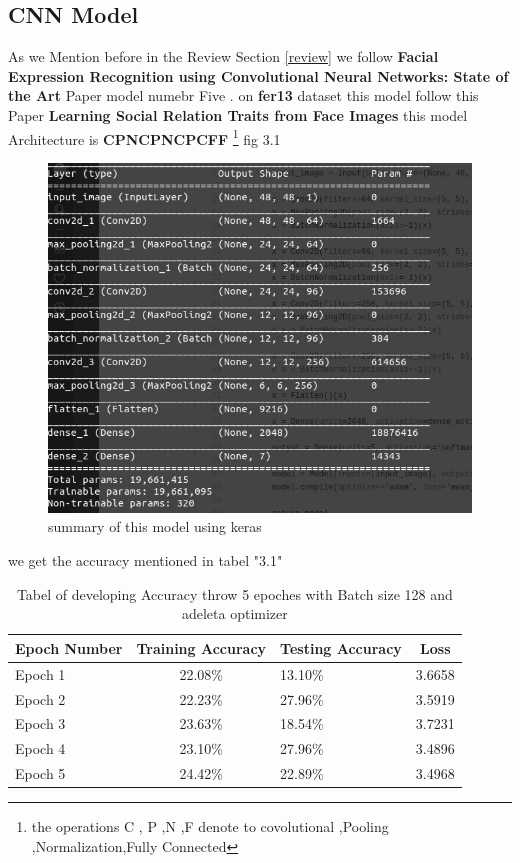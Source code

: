 \subsection{CNN Model}
As we Mention before in the Review Section \ref{review} we follow \textbf{Facial Expression Recognition using Convolutional Neural Networks: State of the Art} Paper\cite{state_of_art} model numebr Five .
on \textbf{fer13} dataset this model follow this Paper \textbf{Learning Social Relation Traits from Face Images} this model Architecture is \textbf{CPNCPNCPCFF} \footnote{ the operations C , P ,N ,F denote to covolutional ,Pooling ,Normalization,Fully Connected } fig 3.1

\begin{figure}
	\centering
	\includegraphics[width=.8\textwidth]{model14.jpg}
	\caption{summary of this model using keras}
\end{figure} 
we get the accuracy mentioned in tabel "3.1"
\begin{table}[h!]
	\begin{center}
		\caption{Tabel of developing Accuracy throw  5 epoches with Batch size 128 and adeleta optimizer \newline}
		\begin{tabular}{l|c|l|c}
			\textbf{Epoch Number} & \textbf{Training Accuracy} & \textbf{Testing Accuracy} &\textbf{Loss}\\ 
			\hline 
			Epoch 1 & 22.08\% & 13.10\% & 3.6658 \\
			Epoch 2 & 22.23\% & 27.96\% & 3.5919 \\
			Epoch 3 & 23.63\% & 18.54\% & 3.7231 \\
			Epoch 4 & 23.10\% & 27.96\% & 3.4896 \\
			Epoch 5 & 24.42\% & 22.89\% &  3.4968 \\									
			\end{tabular}
	\end{center}
\end{table}
